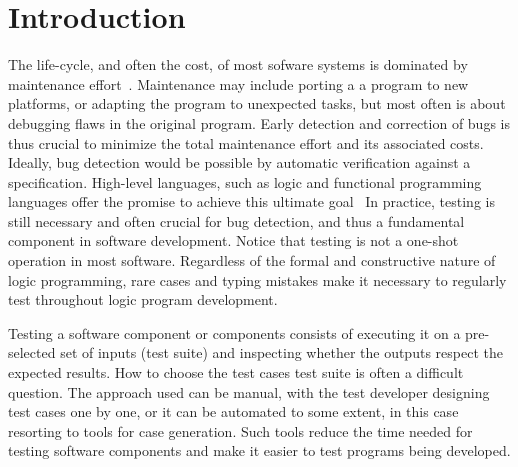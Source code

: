 
\section{Introduction}
\label{sec:intro}


The life-cycle, and often the cost, of most sofware systems is
dominated by maintenance effort~\cite{wasnik2013software}.
%
Maintenance may include porting a a program to new platforms, or
adapting the program to unexpected tasks, but most often is about
debugging flaws in the original program.
%
Early detection and
correction of bugs is thus crucial to minimize the total maintenance
effort and its associated costs.
%
Ideally, bug detection would be possible by automatic verification
against a specification.
%
High-level languages, such as logic and functional programming languages
offer the promise to achieve this ultimate
goal~\cite{wadler1989theorems,cortesi1997specification}
%
In practice, testing is still necessary and often crucial for bug
detection, and thus a fundamental component in software development.
%
%
Notice that testing is not a one-shot operation in most software.
%
Regardless of the formal and constructive nature of logic programming,
rare cases and typing mistakes make it necessary to regularly test
throughout logic program development.

Testing a software component or components consists of executing it on
a pre-selected set of inputs (test suite) and inspecting whether the outputs
respect the expected results.
%
%
How to choose the test cases test suite is often a difficult
question.
%
The approach used
can be  manual, with the test developer designing test cases one by
one, or it can be automated to some extent, in this case resorting to
tools for case generation.
%
Such tools reduce the time needed for testing software components and make
it easier to test programs being developed.


